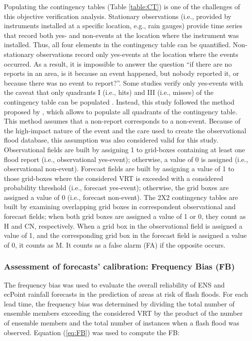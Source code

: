 \documentclass[techmemo]{ecmwfrep}%
\begin{document}
Populating the contingency tables (Table \ref{table:CT}) is one of the challenges of this objective verification analysis. Stationary observations (i.e., provided by instruments installed at a specific location, e.g., rain gauges) provide time series that record both yes- and non-events at the location where the instrument was installed. Thus, all four elements in the contingency table can be quantified. Non-stationary observations record only yes-events at the location where the events occurred. As a result, it is impossible to answer the question “if there are no reports in an area, is it because an event happened, but nobody reported it, or because there was no event to report?”. Some studies verify only yes-events with the caveat that only quadrants I (i.e., hits) and III (i.e., misses) of the contingency table can be populated \citep{Robbins2018}. Instead, this study followed the method proposed by \cite{Tsonevsky2018}, which allows to populate all quadrants of the contingency table. This method assumes that a non-report corresponds to a non-event. Because of the high-impact nature of the event and the care used to create the observational flood database, this assumption was also considered valid for this study. Observational fields are built by assigning 1 to grid-boxes containing at least one flood report (i.e., observational yes-event); otherwise, a value of 0 is assigned (i.e., observational non-event). Forecast fields are built by assigning a value of 1 to those grid-boxes where the considered VRT is exceeded with a considered probability threshold (i.e., forecast yes-event); otherwise, the grid boxes are assigned a value of 0 (i.e., forecast non-event). The 2X2 contingency tables are built by examining overlapping grid boxes in correspondent observational and forecast fields; when both grid boxes are assigned a value of 1 or 0, they count as H and CN, respectively. When a grid box in the observational field is assigned a value of 1, and the corresponding grid box in the forecast field is assigned a value of 0, it counts as M. It counts as a false alarm (FA) if the opposite occurs.

\subsubsection{Assessment of forecasts’ calibration: Frequency Bias (FB)}
The frequency bias was used to evaluate the overall reliability of ENS and ecPoint rainfall forecasts in the prediction of areas at risk of flash floods. For each lead time, the frequency bias was determined by dividing the total number of ensemble members exceeding the considered VRT by the product of the number of ensemble members and the total number of instances when a flash flood was observed. Equation (\ref{eq:FB}) was used to compute the FB:
\end{document}
